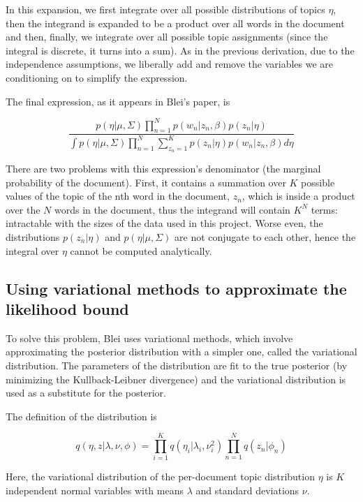\documentclass[12pt,a4paper,twoside,openright]{report}
\begin{document}
In this expansion, we first integrate over all possible distributions of topics $\eta$, then the integrand is expanded to be a product over all words in the document and then, finally, we integrate over all possible topic assignments (since the integral is discrete, it turns into a sum). As in the previous derivation, due to the independence assumptions, we liberally add and remove the variables we are conditioning on to simplify the expression.

The final expression, as it appears in Blei's paper, is

\begin{equation}
\frac{p(\eta | \mu, \Sigma) \prod\limits_{n=1}^N p(w_n | z_n, \beta) p(z_n | \eta)}{\int p(\eta | \mu, \Sigma)  \prod\limits_{n=1}^N \sum\limits_{z_n=1}^K p(z_n | \eta) p(w_n | z_n, \beta) d\eta}
\end{equation}

There are two problems with this expression's denominator (the marginal probability of the document). First, it contains a summation over $K$ possible values of the topic of the nth word in the document, $z_n$, which is inside a product over the $N$ words in the document, thus the integrand will contain $K^N$ terms: intractable with the sizes of the data used in this project. Worse even, the distributions $p(z_n | \eta)$ and $p(\eta | \mu, \Sigma)$ are not conjugate to each other, hence the integral over $\eta$ cannot be computed analytically.

\subsection{Using variational methods to approximate the likelihood bound}

To solve this problem, Blei uses variational methods, which involve approximating the posterior distribution with a simpler one, called the variational distribution. The parameters of the distribution are fit to the true posterior (by minimizing the Kullback-Leibner divergence) and the variational distribution is used as a substitute for the posterior.

The definition of the distribution is

\begin{equation}
q(\eta, z | \lambda, \nu, \phi) = \prod\limits_{i=1}^K q(\eta_i|\lambda_i, \nu_i^2) \prod\limits_{n=1}^N q(z_n | \phi_n)
\end{equation}

Here, the variational distribution of the per-document topic distribution $\eta$ is $K$ independent normal variables with means $\lambda$ and standard deviations $\nu$.
\end{document}
